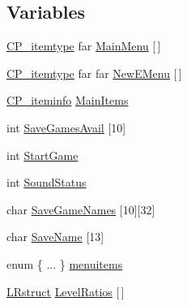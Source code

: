 \subsection*{Variables}
\begin{DoxyCompactItemize}
\item 
\hyperlink{structCP__itemtype}{CP\_\-itemtype} far \hyperlink{WL__MENU_8H_a6d3982b9d13e9f258a6229f7c6259fd2}{MainMenu} \mbox{[}$\,$\mbox{]}
\item 
\hyperlink{structCP__itemtype}{CP\_\-itemtype} far far \hyperlink{WL__MENU_8H_a533b654d50a711383a0d2135cf4bd86a}{NewEMenu} \mbox{[}$\,$\mbox{]}
\item 
\hyperlink{structCP__iteminfo}{CP\_\-iteminfo} \hyperlink{WL__MENU_8H_a93c27abff0c41dacc4c91cba6616ebc8}{MainItems}
\item 
int \hyperlink{WL__MENU_8H_a7b06c11298b6b799f082f8188c0dbd2c}{SaveGamesAvail} \mbox{[}10\mbox{]}
\item 
int \hyperlink{WL__MENU_8H_a15b7f4ec468d94c3291394639f2fe581}{StartGame}
\item 
int \hyperlink{WL__MENU_8H_a0564d61a788235ef511758c3922b9927}{SoundStatus}
\item 
char \hyperlink{WL__MENU_8H_a676a8d7bb5b64f29ab3ea8fe6a4f3242}{SaveGameNames} \mbox{[}10\mbox{]}\mbox{[}32\mbox{]}
\item 
char \hyperlink{WL__MENU_8H_a8501cb4aab0ffc4fca7a7a979ae7728d}{SaveName} \mbox{[}13\mbox{]}
\item 
enum  \{ ... \}  \hyperlink{WL__MENU_8H_ae41a615bd5a5e741ff7c27e54c48bbcb}{menuitems}
\item 
\hyperlink{structLRstruct}{LRstruct} \hyperlink{WL__MENU_8H_a2445c6731e7a1b5e7b8f3da17525e322}{LevelRatios} \mbox{[}$\,$\mbox{]}
\end{DoxyCompactItemize}


